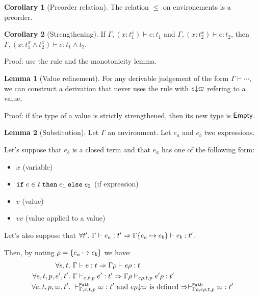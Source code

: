 \documentclass[a4paper]{article}
\theoremstyle{definition}
\newtheorem{lemma}{Lemma}
\newtheorem{corollary}{Corollary}
\begin{document}
        \begin{corollary}[Preorder relation]
          The relation $\leq$ on environements is a preorder.
        \end{corollary}
    
        \begin{corollary}[Strengthening]
          If $\Gamma, (x:t_1^x) \vdash e:t_1$ and $\Gamma, (x:t_2^x) \vdash e:t_2$, then
          $\Gamma, (x:t_1^x \land t_2^x) \vdash e:t_1\land t_2$.
        \end{corollary}
        Proof: use the  rule and the monotonicity lemma.

        \begin{lemma}[Value refinement]
          For any derivable judgement of the form $\Gamma \vdash \cdots$, we can construct a derivation that
          never uses the rule  with $\occ e \varpi$ refering to a value.
        \end{lemma}
        Proof: if the type of a value is strictly strengthened, then its new type is $\Empty$.

        \begin{lemma}[Substitution]
          Let $\Gamma$ an environment. Let $e_a$ and $e_b$ two expressions.

          Let's suppose that $e_b$ is a closed term and that $e_a$ has one of the following form:
          \begin{itemize}
            \item $x$ (variable)
            \item $\ite e t {e_1} {e_2}$ (if expression)
            \item $v$ (value)
            \item $v v$ (value applied to a value)
          \end{itemize}
          Let's also suppose that $\forall t'.\ \Gamma \vdash e_a : t' \Rightarrow \Gamma\subst {e_a} {e_b} \vdash e_b:t'$.
          
          Then, by noting $\rho = \subst {e_a} {e_b}$ we have:
          \begin{align*}
            \forall e,t.\ &\Gamma \vdash e:t \Rightarrow \Gamma\rho \vdash e\rho:t\\
            \forall e,t,p,e',t'.\ &\Gamma \cvdash p {e} {t} e':t' \Rightarrow \Gamma\rho \cvdash p {e\rho} {t} e'\rho:t'\\
            \forall e,t,p,\varpi,t'.\ &\pvdash \Gamma p e t \varpi:t' \text{ and }\occ {e\rho} \varpi\text{ is defined} \Rightarrow \pvdash {\Gamma\rho} p {e\rho} t \varpi:t'
          \end{align*}
        \end{lemma}
\end{document}
